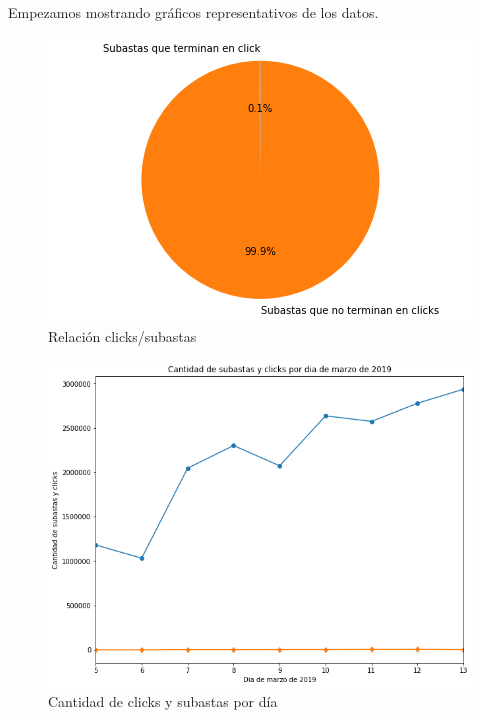 \documentclass[a4paper, 12pt]{article}
\begin{document}
	 Empezamos mostrando gráficos representativos de los datos.
	\FloatBarrier
		\begin{figure}[h]
			\centering
			\includegraphics[width=350pt]{images/auctions-clicks/subastasterminadasenclicks.png}
			\caption{Relación clicks/subastas}
			\label{subastasterminadasenclicks}
		\end{figure}

		\begin{figure}[h]
			\centering
			\includegraphics[width=350pt]{images/auctions-clicks/subyclickspordia.png}
			\caption{Cantidad de clicks y subastas por día}
			\label{clicksysubastaspordia}
		\end{figure}
\end{document}
